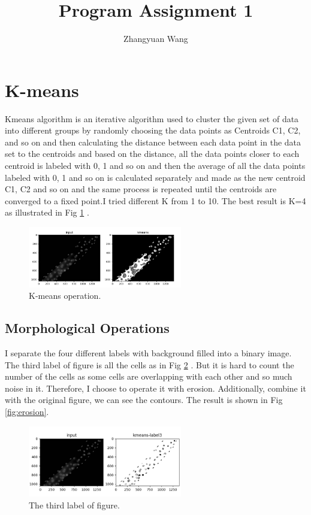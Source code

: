 \documentclass{article}
\title{Program Assignment 1}
\author{Zhangyuan Wang}
\begin{document}
\maketitle




\section{K-means}
Kmeans algorithm is an iterative algorithm used to cluster the given set of data into different groups by randomly choosing the data points as Centroids C1, C2, and so on and then calculating the distance between each data point in the data set to the centroids and based on the distance, all the data points closer to each centroid is labeled with 0, 1 and so on and then the average of all the data points labeled with 0, 1 and so on is calculated separately and made as the new centroid C1, C2 and so on and the same process is repeated until the centroids are converged to a fixed point.I tried different K from 1 to 10. The best result is K=4 as illustrated  in Fig \ref{fig:kmeans} .\par
\begin{figure} [H]
\centering
\includegraphics[width=0.6\textwidth]{Figure_1.png}
\caption{\label{fig:kmeans}K-means operation.}
\end{figure}
\subsection{Morphological Operations}
I separate the four different labels with background filled into a binary image. The third label of figure is all the cells as in Fig \ref{fig:3means} . But it is hard to count the number of the cells as some cells are overlapping with each other and so much noise in it. Therefore, I choose to operate it with erosion. Additionally, combine it with the original figure, we can see the contours. The result is shown in Fig \ref{fig:erosion}.
\begin{figure} [H]
\centering
\includegraphics[width=0.6\textwidth]{Figure_2.png}
\caption{\label{fig:3means}The third label of figure.}
\end{figure}
\end{document}
